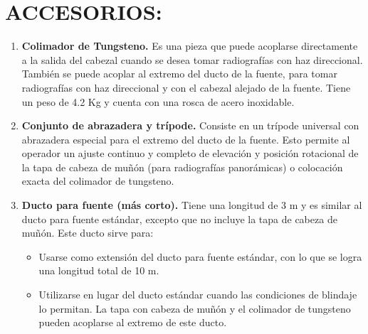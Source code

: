 \section*{ACCESORIOS:}
\begin{enumerate}
    \item \textbf{Colimador de Tungsteno.} Es una pieza que puede acoplarse directamente a la salida del cabezal cuando se desea tomar radiografías con haz direccional. También se puede acoplar al extremo del ducto de la fuente, para tomar radiografías con haz direccional y con el cabezal alejado de la fuente. Tiene un peso de 4.2 Kg y cuenta con una rosca de acero inoxidable.

    \item \textbf{Conjunto de abrazadera y trípode.} Consiste en un trípode universal con abrazadera especial para el extremo del ducto de la fuente. Esto permite al operador un ajuste continuo y completo de elevación y posición rotacional de la tapa de cabeza de muñón (para radiografías panorámicas) o colocación exacta del colimador de tungsteno.

    \item \textbf{Ducto para fuente (más corto).} Tiene una longitud de 3 m y es similar al ducto para fuente estándar, excepto que no incluye la tapa de cabeza de muñón. Este ducto sirve para:
    \begin{itemize}
        \item Usarse como extensión del ducto para fuente estándar, con lo que se logra una longitud total de 10 m.
        \item Utilizarse en lugar del ducto estándar cuando las condiciones de blindaje lo permitan. La tapa con cabeza de muñón y el colimador de tungsteno pueden acoplarse al extremo de este ducto.
    \end{itemize}
\end{enumerate}
